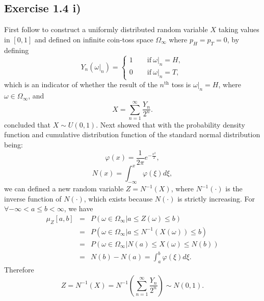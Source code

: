 \documentclass[final,3p,authoryear]{elsarticle}
\begin{document}
	\subsection{Exercise 1.4 i)}
		First follow \cite[Example 1.2.5, p.~11-12]{shreve2004stochastic} to construct a uniformly distributed random variable $X$ taking values in $\left[0,1\right]$ and defined on infinite coin-toss space $\Omega_\infty$ where $p_H=p_T=0$, by defining
		\begin{equation}
			Y_n(\omega|_n)=
			\begin{cases}
				1\qquad \mathrm{if~} \omega|_n=H,\\
				0\qquad \mathrm{if~} \omega|_n=T,
			\end{cases}
		\end{equation}
		which is an indicator of whether the result of the $n^\mathrm{th}$ toss is $\omega|_n=H$, where $\omega \in \Omega_\infty$, and
		\begin{equation}
			X=\sum\limits_{n=1}^{\infty} \frac{Y_n}{2^n}
			.
		\end{equation}
		\cite[Example 1.2.5, p.~11-12]{shreve2004stochastic} concluded that $X\sim U(0,1)$.
		Next \cite[Example 1.2.6, p.~12-13]{shreve2004stochastic} showed that with the probability density function and cumulative distribution function of the standard normal distribution being:
		\begin{equation}
			\varphi(x)=\frac{1}{2\pi} e^{-\frac{x^2}{2}}
			,
		\end{equation}
		\begin{equation}
			N(x)=\int_{-\infty}^{x} \varphi(\xi) d\xi
			,
		\end{equation}
		we can defined a new random variable $Z=N^{-1}(X)$, where $N^{-1}(\cdot)$ is the inverse function of $N(\cdot)$, which exists because $N(\cdot)$ is strictly increasing. For $\forall -\infty < a \leq b < \infty$, we have
		\begin{eqnarray}
			\mu_Z[a,b]&=&P(\omega \in \Omega_\infty| a \leq Z(\omega) \leq b)
			\nonumber\\
			&=&P(\omega \in \Omega_\infty| a \leq N^{-1}(X(\omega)) \leq b)
			\nonumber\\
			&=&P(\omega \in \Omega_\infty| N(a) \leq X(\omega) \leq N(b))
			\nonumber\\
			&=&N(b)-N(a)=\int_{a}^{b} \varphi(\xi) d\xi
			.
		\end{eqnarray}
		Therefore
		\begin{equation}
			Z=N^{-1}(X)=N^{-1}(\sum\limits_{n=1}^{\infty} \frac{Y_n}{2^n}) \sim N(0,1)
			.
		\end{equation}
		
\end{document}
